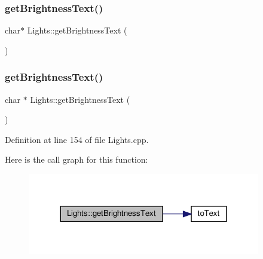 \mbox{\label{class_lights_a4bb15ec318f4b6e5f2c12d6c6df73caa}} 
\subsubsection{\texorpdfstring{get\+Brightness\+Text()}{getBrightnessText()}\hspace{0.1cm}{\footnotesize\ttfamily [1/2]}}
{\footnotesize\ttfamily char$\ast$ Lights\+::get\+Brightness\+Text (\begin{DoxyParamCaption}{ }\end{DoxyParamCaption})}

\mbox{\label{class_lights_a9b3e722f1a168d74686e7ee94bf1634b}} 
\subsubsection{\texorpdfstring{get\+Brightness\+Text()}{getBrightnessText()}\hspace{0.1cm}{\footnotesize\ttfamily [2/2]}}
{\footnotesize\ttfamily char $\ast$ Lights\+::get\+Brightness\+Text (\begin{DoxyParamCaption}{ }\end{DoxyParamCaption})}



Definition at line 154 of file Lights.\+cpp.

Here is the call graph for this function\+:
\nopagebreak
\begin{figure}[H]
\begin{center}
\leavevmode
\includegraphics[width=288pt]{class_lights_a9b3e722f1a168d74686e7ee94bf1634b_cgraph}
\end{center}
\end{figure}
\mbox{\label{class_lights_afa7da12d1c3c6646a547220f34c90bd3}} 

